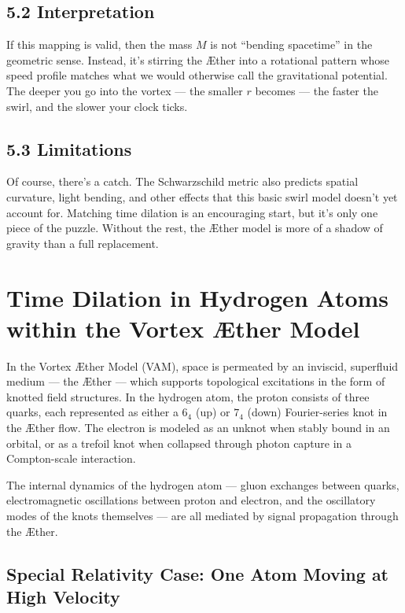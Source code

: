 \documentclass[11pt]{article}
\begin{document}
\subsection*{5.2 Interpretation}

If this mapping is valid, then the mass $M$ is not “bending spacetime” in the geometric sense. Instead, it’s stirring the Æther into a rotational pattern whose speed profile matches what we would otherwise call the gravitational potential. The deeper you go into the vortex — the smaller $r$ becomes — the faster the swirl, and the slower your clock ticks.

\subsection*{5.3 Limitations}

Of course, there’s a catch. The Schwarzschild metric also predicts spatial curvature, light bending, and other effects that this basic swirl model doesn’t yet account for. Matching time dilation is an encouraging start, but it’s only one piece of the puzzle. Without the rest, the Æther model is more of a shadow of gravity than a full replacement.

\section{Time Dilation in Hydrogen Atoms within the Vortex Æther Model}

In the Vortex Æther Model (VAM), space is permeated by an inviscid, superfluid medium --- the Æther --- which supports topological excitations in the form of knotted field structures. In the hydrogen atom, the proton consists of three quarks, each represented as either a $6_4$ (up) or $7_4$ (down) Fourier-series knot in the Æther flow. The electron is modeled as an unknot when stably bound in an orbital, or as a trefoil knot when collapsed through photon capture in a Compton-scale interaction.

The internal dynamics of the hydrogen atom --- gluon exchanges between quarks, electromagnetic oscillations between proton and electron, and the oscillatory modes of the knots themselves --- are all mediated by signal propagation through the Æther.

\subsection{Special Relativity Case: One Atom Moving at High Velocity}
\end{document}
